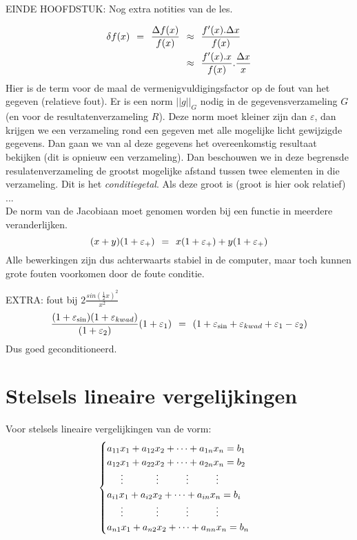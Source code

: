 \documentclass[11pt]{report}
\def \eq {\hspace{1.5mm}=\hspace{1.5mm}}
\def \appx {\hspace{1.5mm}\approx \hspace{1.5mm}}
\begin{document}
 		  EINDE HOOFDSTUK: Nog extra notities van de les.
				
		\begin{align}
			\delta f(x) \eq \frac{\Delta f(x)}{f(x)} &\appx \frac{f'(x) . \Delta x}{f(x)}\\
			&\appx \frac{f'(x) . x}{f(x)}. \frac{\Delta x}{x}
		\end{align}
		Hier is de term voor de maal de vermenigvuldigingsfactor op de fout van het gegeven (relatieve fout).
		Er is een norm $||g||_G$ nodig in de gegevensverzameling $G$ (en voor de resultatenverzameling $R$). Deze norm moet kleiner zijn dan $\varepsilon$, dan krijgen we een verzameling rond een gegeven met alle mogelijke licht gewijzigde gegevens. Dan gaan we van al deze gegevens het overeenkomstig resultaat bekijken (dit is opnieuw een verzameling). Dan beschouwen we in deze begrensde resulatenverzameling de grootst mogelijke afstand tussen twee elementen in die verzameling. Dit is het \textit{conditiegetal}. Als deze groot is (groot is hier ook relatief) ... \\
		De norm van de Jacobiaan moet genomen worden bij een functie in meerdere veranderlijken.
		$$(x + y)(1 + \varepsilon_+) \eq x(1 + \varepsilon_+) + y(1 + \varepsilon_+)$$
		Alle bewerkingen zijn dus achterwaarts stabiel in de computer, maar toch kunnen grote fouten  voorkomen door de foute conditie.
		
		EXTRA: fout bij $2\frac{sin(\frac{1}{2}x)^2}{x^2}$
		$$\frac{(1 + \varepsilon_{\sin})(1 + \varepsilon_{kwad})}{(1 + \varepsilon_2)}(1 + \varepsilon_1) \eq (1 + \varepsilon_{\sin} + \varepsilon_{kwad} + \varepsilon_1 - \varepsilon_2)$$
		Dus goed geconditioneerd.
		
\chapter{Stelsels lineaire vergelijkingen}
	Voor stelsels lineaire vergelijkingen van de vorm:
	\begin{equation*}
		\begin{cases}
			
			a_{11}x_1 + a_{12}x_2 + \dots + a_{1n}x_n = b_1 \\
			a_{12}x_1 + a_{22}x_2 + \dots + a_{2n}x_n = b_2 \\
			\hspace{5mm}\vdots \hspace{12mm} \vdots \hspace{10mm} \vdots \hspace{10mm} \vdots \\
			a_{i1}x_1 + a_{i2}x_2 + \dots + a_{in}x_n = b_i \\
			\hspace{5mm}\vdots \hspace{12mm} \vdots \hspace{10mm} \vdots \hspace{10mm} \vdots \\
			a_{n1}x_1 + a_{n2}x_2 + \dots + a_{nn}x_n = b_n 
		\end{cases}
	\end{equation*}
	
\end{document}
